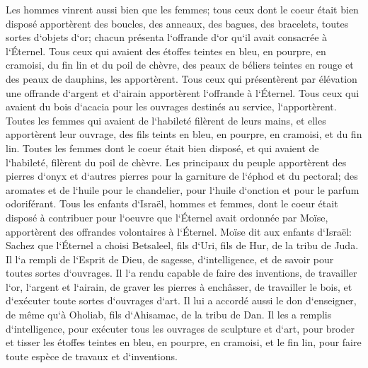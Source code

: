 \verse Les hommes vinrent aussi bien que les femmes; tous ceux dont le coeur était bien disposé apportèrent des boucles, des anneaux, des bagues, des bracelets, toutes sortes d`objets d`or; chacun présenta l`offrande d`or qu`il avait consacrée à l`Éternel. 
\verse Tous ceux qui avaient des étoffes teintes en bleu, en pourpre, en cramoisi, du fin lin et du poil de chèvre, des peaux de béliers teintes en rouge et des peaux de dauphins, les apportèrent. 
\verse Tous ceux qui présentèrent par élévation une offrande d`argent et d`airain apportèrent l`offrande à l`Éternel. Tous ceux qui avaient du bois d`acacia pour les ouvrages destinés au service, l`apportèrent. 
\verse Toutes les femmes qui avaient de l`habileté filèrent de leurs mains, et elles apportèrent leur ouvrage, des fils teints en bleu, en pourpre, en cramoisi, et du fin lin. 
\verse Toutes les femmes dont le coeur était bien disposé, et qui avaient de l`habileté, filèrent du poil de chèvre. 
\verse Les principaux du peuple apportèrent des pierres d`onyx et d`autres pierres pour la garniture de l`éphod et du pectoral; 
\verse des aromates et de l`huile pour le chandelier, pour l`huile d`onction et pour le parfum odoriférant. 
\verse Tous les enfants d`Israël, hommes et femmes, dont le coeur était disposé à contribuer pour l`oeuvre que l`Éternel avait ordonnée par Moïse, apportèrent des offrandes volontaires à l`Éternel. 
\verse Moïse dit aux enfants d`Israël: Sachez que l`Éternel a choisi Betsaleel, fils d`Uri, fils de Hur, de la tribu de Juda. 
\verse Il l`a rempli de l`Esprit de Dieu, de sagesse, d`intelligence, et de savoir pour toutes sortes d`ouvrages. 
\verse Il l`a rendu capable de faire des inventions, de travailler l`or, l`argent et l`airain, 
\verse de graver les pierres à enchâsser, de travailler le bois, et d`exécuter toute sortes d`ouvrages d`art. 
\verse Il lui a accordé aussi le don d`enseigner, de même qu`à Oholiab, fils d`Ahisamac, de la tribu de Dan. 
\verse Il les a remplis d`intelligence, pour exécuter tous les ouvrages de sculpture et d`art, pour broder et tisser les étoffes teintes en bleu, en pourpre, en cramoisi, et le fin lin, pour faire toute espèce de travaux et d`inventions. 

\chapter{}

